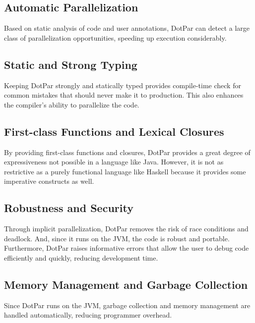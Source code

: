\subsection{Automatic Parallelization}
Based on static analysis of code and user annotations, DotPar can
detect a large class of parallelization opportunities, speeding up
execution considerably.

\subsection{Static and Strong Typing}
Keeping DotPar strongly and statically typed provides compile-time
check for common mistakes that should never make it to
production. This also enhances the compiler’s ability to parallelize
the code.

\subsection{First-class Functions and Lexical Closures}
By providing first-class functions and closures, DotPar provides a
great degree of expressiveness not possible in a language like
Java. However, it is not as restrictive as a purely functional
language like Haskell because it provides some imperative constructs
as well.

\subsection{Robustness and Security}
Through implicit parallelization, DotPar removes the risk of race
conditions and deadlock.  And, since it runs on the JVM, the code is
robust and portable. Furthermore, DotPar raises informative
errors that allow the user to debug code efficiently and quickly,
reducing development time.

\subsection{Memory Management and Garbage Collection}
Since DotPar runs on the JVM, garbage collection and memory management
are handled automatically, reducing programmer overhead.
